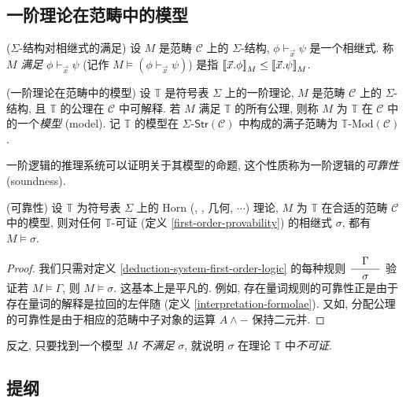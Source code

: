\subsection{一阶理论在范畴中的模型}

\begin{definition}
	{($\Sigma$-结构对相继式的满足)}
	设 $M$ 是范畴 $\mathcal C$ 上的 $\Sigma$-结构, $\phi\vdash_{\vec x}\psi$ 是一个相继式.
	称 $M$ \emph{满足} $\phi\vdash_{\vec x}\psi$ (记作 $M\models(\phi\vdash_{\vec x}\psi)$) 是指 ${[\![\vec x.\phi]\!]}_M \leq {[\![\vec x.\psi]\!]}_M$.
\end{definition}

\begin{definition}
	{(一阶理论在范畴中的模型)}
	设 $\mathbb T$ 是符号表 $\Sigma$ 上的一阶理论, $M$ 是范畴 $\mathcal C$ 上的 $\Sigma$-结构,
	且 $\mathbb T$ 的公理在 $\mathcal C$ 中可解释.
	若 $M$ 满足 $\mathbb T$ 的所有公理, 则称 $M$ 为 $\mathbb T$ 在 $\mathcal C$ 中的一个\emph{模型} (model).
	记 $\mathbb T$ 的模型在 $\Sigma\text{-}\mathsf{Str}(\mathcal C)$ 中构成的满子范畴为 $\mathbb T\text{-Mod}(\mathcal C)$.
\end{definition}

一阶逻辑的推理系统可以证明关于其模型的命题, 这个性质称为一阶逻辑的\emph{可靠性} (soundness).

\begin{prop}
	[label={soundness-first-order-logic}]
	{(可靠性)}
	设 $\mathbb T$ 为符号表 $\Sigma$ 上的 Horn (\regular{}, \coherent{}, 几何, $\cdots$) 理论, $M$ 为 $\mathbb T$ 在合适的范畴 $\mathcal C$ 中的模型, 则对任何 $\mathbb T$-可证 (定义 \ref{first-order-provability}) 的相继式 $\sigma$, 都有 $M\models\sigma$.
\end{prop}
\begin{proof}
	我们只需对定义 \ref{deduction-system-first-order-logic} 的每种规则 $\displaystyle\dfrac{\quad \Gamma \quad}{\quad \sigma \quad}$ 验证若 $M\models\Gamma$, 则 $M\models\sigma$. 这基本上是平凡的. 例如, 存在量词规则的可靠性正是由于存在量词的解释是拉回的左伴随 (定义 \ref{interpretation-formolae}). 又如, 分配公理的可靠性是由于相应的范畴中子对象的运算 $A\land {-}$ 保持二元并.
\end{proof}

\begin{remark}
	{}
	反之, 只要找到一个模型 $M$ \emph{不满足} $\sigma$, 就说明 $\sigma$ 在理论 $\mathbb T$ 中\emph{不可证}.
\end{remark}

\subsection{提纲}

